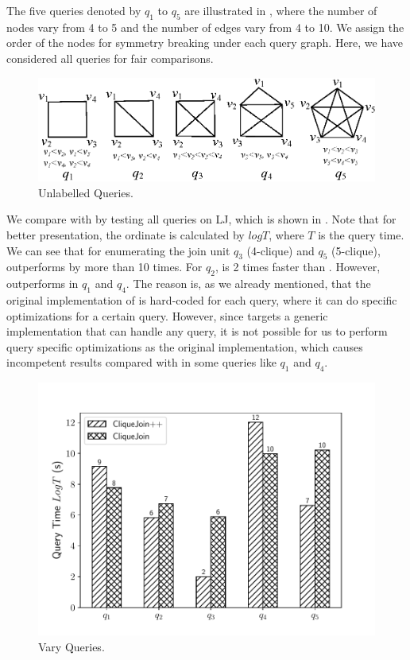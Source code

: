  The five queries denoted by $q_1$ to $q_5$ are illustrated in , where the number of nodes vary from 4 to 5 and the number of edges vary from 4 to 10. We assign the order of the nodes for symmetry breaking\cite{Grochow2007} under each query graph. Here, we have considered all queries for fair comparisons.

\begin{figure}[htb]
  \centering
  \includegraphics[scale=0.6]{figures/unlq.eps}
  \caption{\small{Unlabelled Queries.}}
  \label{fig:unlq}
\end{figure}

 We compare \gencliqjoin with \cliquejoin by testing all queries on LJ, which is shown in . Note that for better presentation, the ordinate is calculated by $logT$, where $T$ is the query time. We can see that for enumerating the join unit $q_3$ (4-clique) and $q_5$ (5-clique), \gencliqjoin outperforms \cliquejoin by more than 10 times. For $q_2$, \gencliqjoin is 2 times faster than \cliquejoin. However, \cliquejoin outperforms \gencliqjoin in $q_1$ and $q_4$. The reason is, as we already mentioned, that the original implementation of \cliquejoin is hard-coded for each query, where it can do specific optimizations for a certain query. However, since \gencliqjoin targets a generic implementation that can handle any query, it is not possible for us to perform query specific optimizations as the original implementation, which causes incompetent results compared with \cliquejoin in some queries like $q_1$ and $q_4$.

\begin{figure}[htb]
  \centering
  \includegraphics[scale=0.4]{figures/exp1.pdf}
  \caption{\small{Vary Queries.}}
  \label{fig:vary_query}
\end{figure}

